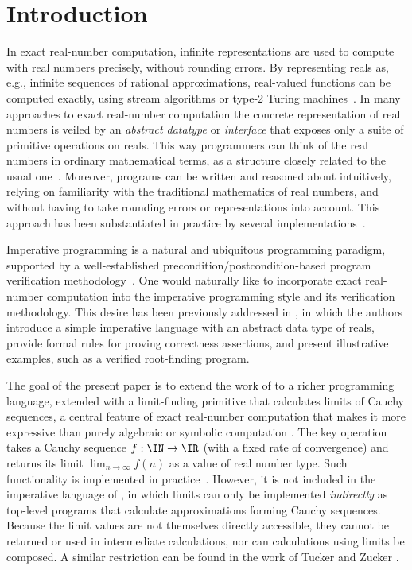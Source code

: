 \section{Introduction}
In exact real-number computation, infinite representations are used to compute with real numbers precisely, without rounding errors.
By representing reals as, e.g., infinite sequences of rational approximations,
real-valued functions can be computed exactly, using stream algorithms or
type-2 Turing machines~\cite{w00}.
In many approaches to exact real-number computation \cite{tucker1999computation,tucker1999computation,tucker2015generalizing,escardo1996pcf,edalat2000integration,escardoSimpson2014,brausse2016semantics} the concrete representation of real numbers is veiled by an \emph{abstract datatype} or \emph{interface} that exposes only a suite of primitive operations on reals.
This way programmers can think of the real numbers in ordinary mathematical terms, as
a structure closely related to the usual one~\cite{hertling99:_real_number_struc_effec_categ,escardoSimpson2001}. Moreover, programs can be written and reasoned about intuitively, relying on familiarity with the traditional mathematics of real numbers, and without having to take rounding errors or representations into account.
This approach has been substantiated in practice by several implementations~\cite{muller2000irram,lambov2007,Ariadne,aern}. 

Imperative programming is a natural and ubiquitous programming paradigm, supported by a well-established precondition/postcondition-based program verification methodology~\cite{apt19:_fifty_years_hoare_logic}.
One would naturally like to incorporate exact real-number computation into the imperative programming style and its verification methodology. This desire has been previously addressed in \cite{brausse2016semantics}, in which the authors introduce a simple imperative language with an abstract data type of reals, provide formal rules for proving correctness assertions, and present illustrative examples, such as a verified root-finding program.

The goal of the present paper is to extend the work of \cite{brausse2016semantics} to a richer programming language, extended with a limit-finding primitive that calculates limits of Cauchy sequences, a central feature of exact real-number computation that makes it more expressive than purely algebraic or symbolic computation \cite{Bra03f,neumann2018topological}. The key operation takes a Cauchy sequence $f : \IN \to \IR$ (with a fixed rate of convergence) and returns its limit $\lim_{n \to \infty} f(n)$ as a value of real number type.
Such functionality is implemented in practice~\cite{muller2000irram}. However, it is not included in the imperative language of \cite{brausse2016semantics}, in which limits can only be implemented \emph{indirectly} as top-level programs that calculate approximations forming Cauchy sequences. Because the limit values are not themselves directly accessible, they cannot be returned or used in intermediate calculations, nor can calculations using limits be composed.
%
A similar restriction can be found in the work of Tucker and Zucker \cite{tucker1999computation,tucker2015generalizing}.


